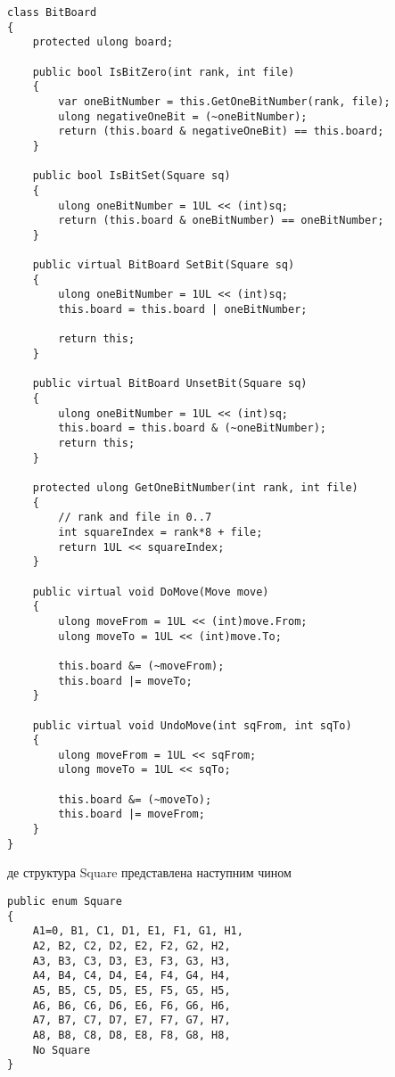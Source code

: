 \documentclass[12pt,a4paper]{article}
\begin{document}
\lstset{xleftmargin=0.5cm,identifierstyle=\ttfamily}
\singlespacing

\begin{lstlisting}
class BitBoard
{
    protected ulong board;

    public bool IsBitZero(int rank, int file)
    {
        var oneBitNumber = this.GetOneBitNumber(rank, file);
        ulong negativeOneBit = (~oneBitNumber);
        return (this.board & negativeOneBit) == this.board;
    }

    public bool IsBitSet(Square sq)
    {
        ulong oneBitNumber = 1UL << (int)sq;			
        return (this.board & oneBitNumber) == oneBitNumber;
    }

    public virtual BitBoard SetBit(Square sq)
    {
        ulong oneBitNumber = 1UL << (int)sq;
        this.board = this.board | oneBitNumber;

        return this;
    }

    public virtual BitBoard UnsetBit(Square sq)
    {
        ulong oneBitNumber = 1UL << (int)sq;
        this.board = this.board & (~oneBitNumber);
        return this;
    }

    protected ulong GetOneBitNumber(int rank, int file)
    {
        // rank and file in 0..7
        int squareIndex = rank*8 + file;
        return 1UL << squareIndex;
    }

    public virtual void DoMove(Move move)
    {
        ulong moveFrom = 1UL << (int)move.From;
        ulong moveTo = 1UL << (int)move.To;

        this.board &= (~moveFrom);
        this.board |= moveTo;
    }

    public virtual void UndoMove(int sqFrom, int sqTo)
    {
        ulong moveFrom = 1UL << sqFrom;
        ulong moveTo = 1UL << sqTo;

        this.board &= (~moveTo);
        this.board |= moveFrom;
    }
}
\end{lstlisting}

\fontsize{14pt}{6mm}\selectfont

де структура Square представлена наступним чином

\singlespacing

\begin{lstlisting}
public enum Square
{		
    A1=0, B1, C1, D1, E1, F1, G1, H1,
    A2, B2, C2, D2, E2, F2, G2, H2,
    A3, B3, C3, D3, E3, F3, G3, H3,
    A4, B4, C4, D4, E4, F4, G4, H4,
    A5, B5, C5, D5, E5, F5, G5, H5,
    A6, B6, C6, D6, E6, F6, G6, H6,
    A7, B7, C7, D7, E7, F7, G7, H7,
    A8, B8, C8, D8, E8, F8, G8, H8,
    No Square
}
\end{lstlisting}
\end{document}
